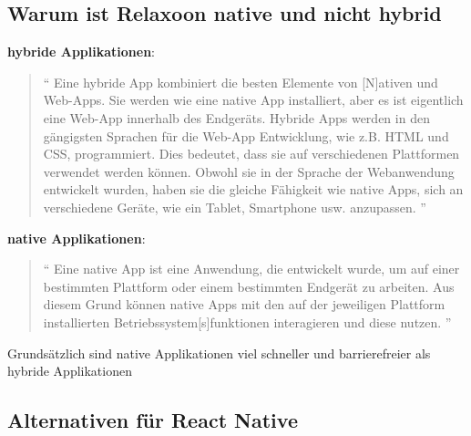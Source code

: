\begin{spacing}{1}
    \subsection{Warum ist Relaxoon native und nicht hybrid}

    \textbf{hybride Applikationen}: \begin{quotation}
        ``
        Eine hybride App kombiniert die besten Elemente von [N]ativen und Web-Apps.
        Sie werden wie eine native App installiert, aber es ist eigentlich
        eine Web-App innerhalb des Endgeräts.
        Hybride Apps werden in den gängigsten Sprachen für die Web-App Entwicklung, wie z.B. HTML und CSS, programmiert. Dies bedeutet, dass sie auf verschiedenen Plattformen verwendet werden können.
        Obwohl sie in der Sprache der Webanwendung entwickelt wurden, haben sie die gleiche Fähigkeit wie native Apps, sich an verschiedene Geräte, wie ein Tablet, Smartphone usw. anzupassen.
        ''
        \cite{native-vs-hybrid}
    \end{quotation}
    \textbf{native Applikationen}: \begin{quotation}
        ``
        Eine native App ist eine Anwendung, die entwickelt wurde,
        um auf einer bestimmten Plattform oder einem bestimmten Endgerät zu arbeiten.
        Aus diesem Grund können native Apps mit den auf der jeweiligen Plattform
        installierten Betriebssystem[s]funktionen interagieren und diese nutzen.
        ''

        \cite{native-vs-hybrid}

    \end{quotation}

    Grundsätzlich sind native Applikationen  viel schneller und barrierefreier als hybride Applikationen
    \cite{native-vs-hybrid}



    \subsection{Alternativen für React Native}


\end{spacing}
